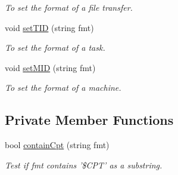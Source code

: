 \begin{DoxyCompactItemize}
\begin{DoxyCompactList}\small\item\em To set the format of a file transfer. \item\end{DoxyCompactList}\item 
\hypertarget{classObjectIdServer_a9031c571c75348149c32631091b0d2f4}{
void \hyperlink{classObjectIdServer_a9031c571c75348149c32631091b0d2f4}{setTID} (string fmt)}
\label{classObjectIdServer_a9031c571c75348149c32631091b0d2f4}

\begin{DoxyCompactList}\small\item\em To set the format of a task. \item\end{DoxyCompactList}\item 
\hypertarget{classObjectIdServer_af23fa4159483ad6ec2b652360fa30944}{
void \hyperlink{classObjectIdServer_af23fa4159483ad6ec2b652360fa30944}{setMID} (string fmt)}
\label{classObjectIdServer_af23fa4159483ad6ec2b652360fa30944}

\begin{DoxyCompactList}\small\item\em To set the format of a machine. \item\end{DoxyCompactList}\end{DoxyCompactItemize}
\subsection*{Private Member Functions}
\begin{DoxyCompactItemize}
\item 
bool \hyperlink{classObjectIdServer_aca4b3a6b6ac76ce51b72332ead290783}{containCpt} (string fmt)
\begin{DoxyCompactList}\small\item\em Test if fmt contains '\$CPT' as a substring. \item\end{DoxyCompactList}\end{DoxyCompactItemize}
